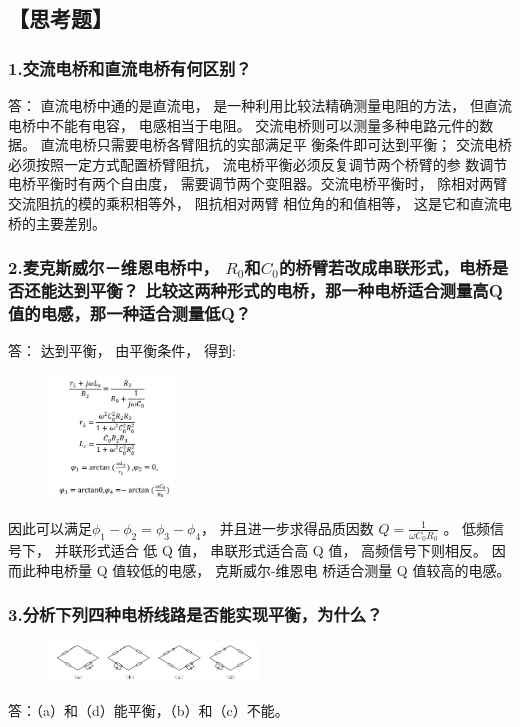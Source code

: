\documentclass[10pt,a4paper,twocolumn,twoside,UTF8]{ctexart}
\begin{document}
	\subsection*{【思考题】}
	\subsubsection*{1.交流电桥和直流电桥有何区别？}
	答： 直流电桥中通的是直流电， 是一种利用比较法精确测量电阻的方法， 但直流电桥中不能有电容，
	电感相当于电阻。 交流电桥则可以测量多种电路元件的数据。 直流电桥只需要电桥各臂阻抗的实部满足平
	衡条件即可达到平衡； 交流电桥必须按照一定方式配置桥臂阻抗， 流电桥平衡必须反复调节两个桥臂的参
	数调节电桥平衡时有两个自由度， 需要调节两个变阻器。交流电桥平衡时， 除相对两臂交流阻抗的模的乘积相等外， 阻抗相对两臂
	相位角的和值相等， 这是它和直流电桥的主要差别。

	\subsubsection*{2.麦克斯威尔－维恩电桥中， $R_0$和$C_0$的桥臂若改成串联形式，电桥是否还能达到平衡？
	比较这两种形式的电桥，那一种电桥适合测量高Q值的电感，那一种适合测量低Q？}
	答： 达到平衡， 由平衡条件， 得到:

	\begin{figure}[!h]
		\centering
		\includegraphics[width=0.3\textwidth]{img//eq.jpg}%
		\label{fig:9}
	\end{figure}

	因此可以满足$\phi_1-\phi_2=\phi_3-\phi_4$， 并且进一步求得品质因数 $Q=\frac{1}{\omega C_0 R_0}$
。 低频信号下， 并联形式适合
低 Q 值， 串联形式适合高 Q 值， 高频信号下则相反。 因而此种电桥量 Q 值较低的电感， 克斯威尔-维恩电
桥适合测量 Q 值较高的电感。

	\subsubsection*{3.分析下列四种电桥线路是否能实现平衡，为什么？}

\begin{figure}[!h]
	\centering
	\includegraphics[width=0.5\textwidth]{img//pr.jpg}%
	\label{fig:10}
\end{figure}
答：（a）和（d）能平衡，（b）和（c）不能。
\end{document}
